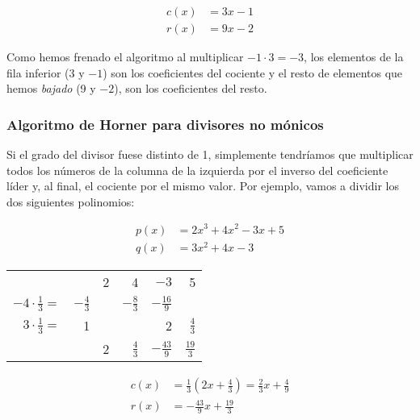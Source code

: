\[
\begin{array}{ll}
	c(x) & = 3x - 1 \\
	r(x) & = 9x - 2
\end{array}
\]

Como hemos frenado el algoritmo al multiplicar $-1 \cdot 3 = -3$, los elementos de la fila inferior (3 y $-1$) son los coeficientes del cociente y el resto de elementos que hemos \textit{bajado} (9 y $-2$), son los coeficientes del resto.

\subsubsection{Algoritmo de Horner para divisores no mónicos}

Si el grado del divisor fuese distinto de 1, simplemente tendríamos que multiplicar todos los números de la columna de la izquierda por el inverso del coeficiente líder y, al final, el cociente por el mismo valor.
Por ejemplo, vamos a dividir los dos siguientes polinomios:

\[
\begin{array}{ll}
	p(x) & = 2x^3 + 4x^2 - 3x + 5 \\
	q(x) & =        3x^2 + 4x - 3
\end{array}
\]

\begin{center}
\setlength{\tabcolsep}{1ex}
\begin{tabular}{r r | r r r r}
	                         &                & 2 & 4              & $-3$            & 5             \\
	$-4 \cdot \frac{1}{3} =$ & $-\frac{4}{3}$ &   & $-\frac{8}{3}$ & $-\frac{16}{9}$ &               \\
	$3 \cdot \frac{1}{3} =$  & 1              &   &                & 2               & $\frac{4}{3}$ \\
	\hline
	                         &                & 2 & $\frac{4}{3}$  & $-\frac{43}{9}$ & $\frac{19}{3}$
\end{tabular}
\end{center}

\[
\begin{array}{ll}
	c(x) & = \frac{1}{3}(2x + \frac{4}{3}) = \frac{2}{3}x + \frac{4}{9} \\
	r(x) & = -\frac{43}{9}x + \frac{19}{3}
\end{array}
\]
